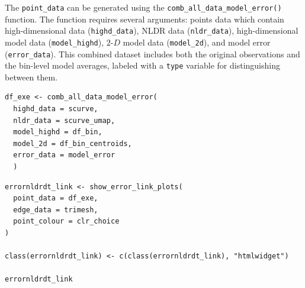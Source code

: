 The \texttt{point\_data} can be generated using the \texttt{comb\_all\_data\_model\_error()} function. The function requires several arguments: points data which contain high-dimensional data (\texttt{highd\_data}), NLDR data (\texttt{nldr\_data}), high-dimensional model data (\texttt{model\_highd}), \(2\text{-}D\) model data (\texttt{model\_2d}), and model error (\texttt{error\_data}). This combined dataset includes both the original observations and the bin-level model averages, labeled with a \texttt{type} variable for distinguishing between them.

\begin{verbatim}
df_exe <- comb_all_data_model_error(
  highd_data = scurve, 
  nldr_data = scurve_umap, 
  model_highd = df_bin, 
  model_2d = df_bin_centroids, 
  error_data = model_error
  )
\end{verbatim}

\begin{verbatim}
errornldrdt_link <- show_error_link_plots(
  point_data = df_exe, 
  edge_data = trimesh, 
  point_colour = clr_choice
)

class(errornldrdt_link) <- c(class(errornldrdt_link), "htmlwidget")

errornldrdt_link
\end{verbatim}

